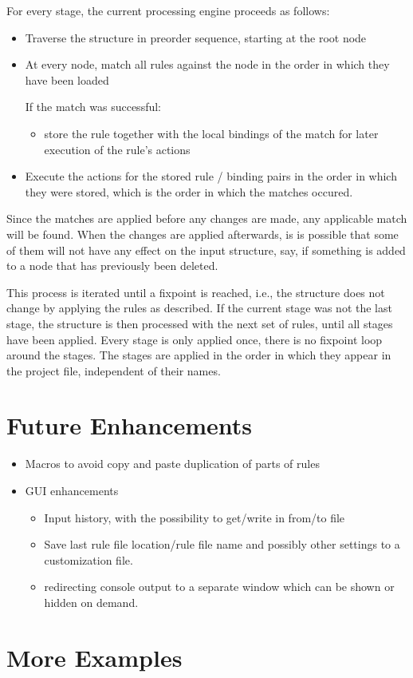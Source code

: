 \documentclass[11pt,a4paper]{article}
\begin{document}
For every stage, the current processing engine proceeds as follows:
\begin{itemize}
\item Traverse the structure in preorder sequence, starting at the root node
\item At every node, match all rules against the node in the order in which
  they have been loaded

  \noindent{}If the match was successful:\\[-3.4ex]
  \begin{itemize}
  \item[] store the rule together with the
    local bindings of the match for later execution of the rule's actions
  \end{itemize}
\item Execute the actions for the stored rule / binding pairs in the order in
  which they were stored, which is the order in which the matches occured.
\end{itemize}

Since the matches are applied before any changes are made, any applicable match
will be found. When the changes are applied afterwards, is is possible that
some of them will not have any effect on the input structure, say, if something
is added to a node that has previously been deleted.

This process is iterated until a fixpoint is reached, i.e., the structure does
not change by applying the rules as described. If the current stage was not the
last stage, the structure is then processed with the next set of rules, until
all stages have been applied. Every stage is only applied once, there is no
fixpoint loop around the stages. The stages are applied in the order in which
they appear in the project file, independent of their names.

\section{Future Enhancements}
\begin{itemize}
\item Macros to avoid copy and paste duplication of parts of rules
\item GUI enhancements
  \begin{itemize}
  \item Input history, with the possibility to get/write in from/to file
  \item Save last rule file location/rule file name and possibly other settings
    to a customization file.
  \item redirecting console output to a separate window which can be shown or
    hidden on demand.
  \end{itemize}
\end{itemize}
\fi

\appendix
\section{More Examples}


\end{document}
